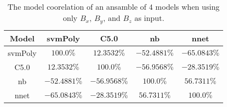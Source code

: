 \begin{table}[!ht]
	\centering
	\begin{tabular}{|c|c|c|c|c|}
		\hline
		Model & svmPoly & C5.0 & nb & nnet \\ \hline
		svmPoly & $100.0\%$ & $12.3532\%$ & $-52.4881\%$ & $-65.0843\%$ \\ \hline
		C5.0 & $12.3532\%$ & $100.0\%$ & $-56.9568\%$ & $-28.3519\%$ \\ \hline
		nb & $-52.4881\%$ & $-56.9568\%$ & $100.0\%$ & $56.7311\%$ \\ \hline
		nnet & $-65.0843\%$ & $-28.3519\%$ & $56.7311\%$ & $100.0\%$ \\ \hline
	\end{tabular}
	\caption{The model coorelation of an ansamble of 4 models when using only $B_{x}$, $B_{y}$, and $B_{z}$ as input.}
	\label{tab:ansamble4:coord}
\end{table}
